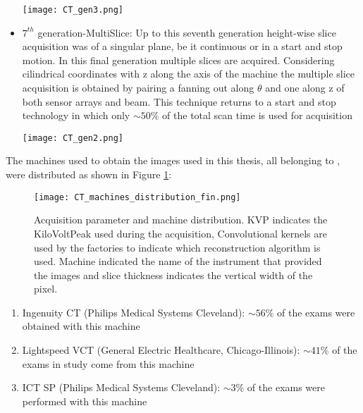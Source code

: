 \begin{itemize}
\begin{minipage}{\linewidth}
            \centering
            \texttt{[image: CT\_gen3.png]}
        \end{minipage}
\item $7^{th}$ generation-MultiSlice: Up to this seventh generation height-wise slice acquisition was of a singular plane, be it continuous or in a start and stop motion. In this final generation multiple slices are acquired. Considering cilindrical coordinates with z along the axis of the machine the multiple slice acquisition is obtained by pairing a fanning out along $\theta$ and one along z of both sensor arrays and beam. This technique returns to a start and stop technology in which only $\sim 50\%$ of the total scan time is used for acquisition

\begin{minipage}{\linewidth}
            \centering
            \texttt{[image: CT\_gen2.png]}
        \end{minipage}
\end{itemize}

The machines used to obtain the images used in this thesis, all belonging to \orsola, were distributed as shown in Figure \ref{fig:ct_dist}:


\begin{figure}[H]
\centering
  		\texttt{[image: CT\_machines\_distribution\_fin.png]}
        \caption{Acquisition parameter and machine distribution. KVP indicates the KiloVoltPeak used during the acquisition, Convolutional kernels are used by the factories to indicate which reconstruction algorithm is used. Machine indicated the name of the instrument that provided the images and slice thickness indicates the vertical width of the pixel.\label{fig:ct_dist}}
\end{figure}

\begin{enumerate}
\item Ingenuity CT  (Philips Medical Systems Cleveland):  $\sim 56\%$ of the exams were obtained with this machine
\item Lightspeed VCT  (General Electric Healthcare, Chicago-Illinois): $\sim 41\%$ of the exams in study come from this machine
\item ICT SP (Philips Medical Systems Cleveland):  $\sim 3\%$ of the exams were performed with this machine
\end{enumerate}

